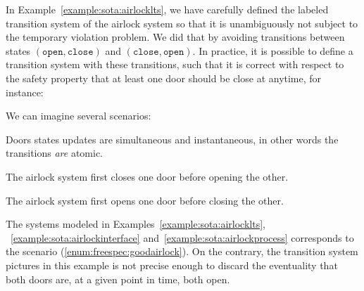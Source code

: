 \begin{example}
  In Example~\ref{example:sota:airlocklts}, we have carefully defined the
  labeled transition system of the airlock system so that it is unambiguously
  not subject to the temporary violation problem.
  We did that by avoiding transitions between states
  \( (\mathtt{open}, \mathtt{close}) \) and
  \( (\mathtt{close}, \mathtt{open}) \).
  In practice, it is possible to define a transition system with these
  transitions, such that it is correct with respect to the safety property that
  at least one door should be close at anytime, for instance:

  \begin{center}
  \end{center}

  We can imagine several scenarios:
  \begin{inparaenum}[(1)]
  \item Doors states updates are simultaneous and instantaneous, in other words
    the transitions \emph{are} atomic.
  \item The airlock system first closes one door before opening the
    other. \label{enum:freespec:goodairlock}
  \item The airlock system first opens one door before closing the
    other. \label{enum:freespec:badairlock}
  \end{inparaenum}
  The systems modeled in Examples~\ref{example:sota:airlocklts},
  ~\ref{example:sota:airlockinterface} and~\ref{example:sota:airlockprocess}
  corresponds to the scenario (\ref{enum:freespec:goodairlock}).
  On the contrary, the transition system pictures in this example is not precise
  enough to discard the eventuality that both doors are, at a given point in
  time, both open.
\end{example}

